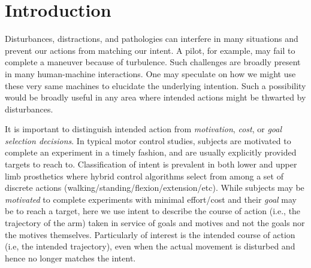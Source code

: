 

\section*{Introduction}
Disturbances, distractions, and pathologies can interfere in many situations and prevent our actions from matching our intent. A pilot, for example, may fail to complete a maneuver because of turbulence. Such challenges are broadly present in many human-machine interactions. One may speculate on how we might use these very same machines to elucidate the underlying intention. Such a possibility would be broadly useful in any area where intended actions might be thwarted by disturbances. 

It is important to distinguish intended action from \textit{motivation}\cite{mcclelland1985motives, rawolle2013relationships}, \textit{cost}\cite{todorov2002optimal, flash1985coordination}, or \textit{goal selection decisions}\cite{ziebart2010modeling}. In typical motor control studies, subjects are motivated to complete an experiment in a timely fashion, and are usually explicitly provided targets to reach to. Classification of intent is prevalent in both lower \cite{strausser2011development, hargrove2013robotic} and upper limb\cite{englehart2003robust, young2012improving} prosthetics where hybrid control algorithms select from among a set of discrete actions (walking/standing/flexion/extension/etc). While subjects may be \textit{motivated} to complete experiments with minimal effort/cost and their \textit{goal} may be to reach a target, here we use intent to describe the course of action (i.e., the trajectory of the arm) taken in service of goals and motives and not the goals nor the motives themselves. Particularly of interest is the intended course of action (i.e, the intended trajectory), even when the actual movement is disturbed and hence no longer matches the intent.

